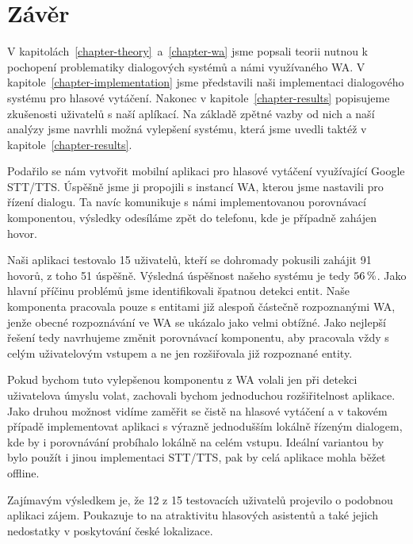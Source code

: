 \chapter*{Závěr}

V kapitolách~\ref{chapter-theory}~a~\ref{chapter-wa} jsme popsali teorii nutnou
k pochopení problematiky dialogových systémů a námi využívaného WA.
V kapitole~\ref{chapter-implementation} jsme představili naši
implementaci dialogového systému pro hlasové vytáčení.
Nakonec v kapitole~\ref{chapter-results} popisujeme zkušenosti
uživatelů s naší aplíkací. Na základě zpětné vazby od nich a naší analýzy jsme navrhli možná
vylepšení systému, která jsme uvedli taktéž v kapitole~\ref{chapter-results}.

Podařilo se nám vytvořit mobilní aplikaci pro hlasové vytáčení využívající
Google STT/TTS. Úspěšně jsme ji propojili s
instancí WA, kterou jsme nastavili pro řízení dialogu. Ta navíc komunikuje s námi
implementovanou porovnávací komponentou, výsledky odesíláme zpět do telefonu,
kde je případně zahájen hovor.

Naši aplikaci testovalo 15 uživatelů, kteří se dohromady pokusili zahájit 91 hovorů,
z toho 51 úspěšně. Výsledná úspěšnost našeho systému je tedy \(56\,\rm \%\).
Jako hlavní příčinu problémů jsme identifikovali špatnou detekci entit.
Naše komponenta pracovala pouze s entitami již alespoň částečně rozpoznanými
WA, jenže obecné rozpoznávání ve WA se ukázalo jako velmi obtížné. Jako nejlepší
řešení tedy navrhujeme změnit porovnávací komponentu, aby pracovala vždy s celým
uživatelovým vstupem a ne jen rozšiřovala již rozpoznané entity.

Pokud bychom tuto vylepšenou komponentu z WA volali jen při detekci uživatelova
úmyslu volat, zachovali bychom jednoduchou rozšiřitelnost aplikace. Jako
druhou možnost vidíme zaměřit se čistě na hlasové vytáčení a v takovém
případě implementovat aplikaci s výrazně jednodušším lokálně řízeným
dialogem, kde by i porovnávání probíhalo lokálně na celém vstupu. Ideální
variantou by bylo použít i jinou implementaci STT/TTS, pak by
celá aplikace mohla běžet offline.

Zajímavým výsledkem je, že 12 z 15 testovacích uživatelů projevilo o podobnou
aplikaci zájem. Poukazuje to na atraktivitu hlasových asistentů
a také jejich nedostatky v poskytování české lokalizace.